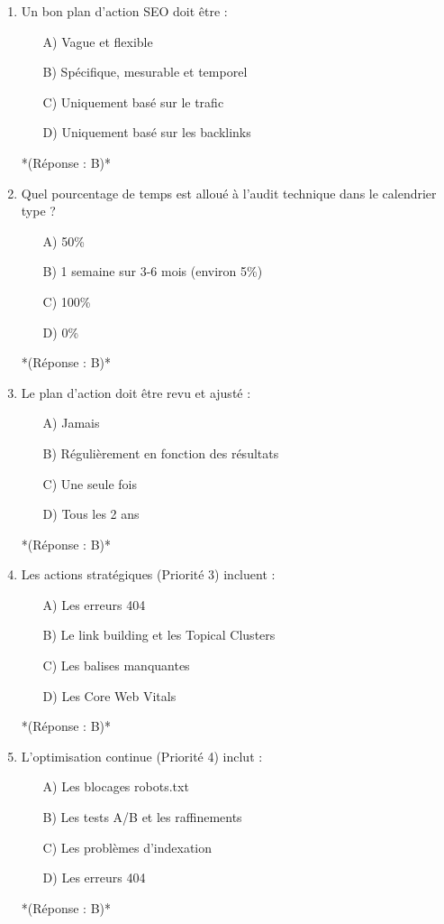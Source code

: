 \documentclass[12pt,a4paper,twoside]{report}
\begin{document}
\begin{enumerate}
    \item Un bon plan d'action SEO doit être :
    \begin{itemize}
        \item[A)] Vague et flexible
        \item[B)] Spécifique, mesurable et temporel
        \item[C)] Uniquement basé sur le trafic
        \item[D)] Uniquement basé sur les backlinks
    \end{itemize}
    *(Réponse : B)*

    \item Quel pourcentage de temps est alloué à l'audit technique dans le calendrier type ?
    \begin{itemize}
        \item[A)] 50\%
        \item[B)] 1 semaine sur 3-6 mois (environ 5\%)
        \item[C)] 100\%
        \item[D)] 0\%
    \end{itemize}
    *(Réponse : B)*

    \item Le plan d'action doit être revu et ajusté :
    \begin{itemize}
        \item[A)] Jamais
        \item[B)] Régulièrement en fonction des résultats
        \item[C)] Une seule fois
        \item[D)] Tous les 2 ans
    \end{itemize}
    *(Réponse : B)*

    \item Les actions stratégiques (Priorité 3) incluent :
    \begin{itemize}
        \item[A)] Les erreurs 404
        \item[B)] Le link building et les Topical Clusters
        \item[C)] Les balises manquantes
        \item[D)] Les Core Web Vitals
    \end{itemize}
    *(Réponse : B)*

    \item L'optimisation continue (Priorité 4) inclut :
    \begin{itemize}
        \item[A)] Les blocages robots.txt
        \item[B)] Les tests A/B et les raffinements
        \item[C)] Les problèmes d'indexation
        \item[D)] Les erreurs 404
    \end{itemize}
    *(Réponse : B)*


\end{enumerate}
\end{document}
